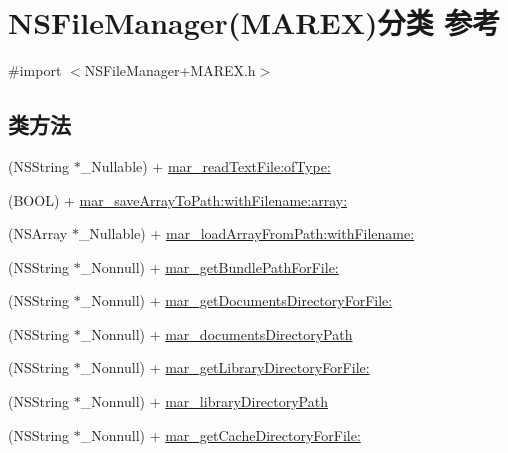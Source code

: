 \hypertarget{category_n_s_file_manager_07_m_a_r_e_x_08}{}\section{N\+S\+File\+Manager(M\+A\+R\+EX)分类 参考}
\label{category_n_s_file_manager_07_m_a_r_e_x_08}


{\ttfamily \#import $<$N\+S\+File\+Manager+\+M\+A\+R\+E\+X.\+h$>$}

\subsection*{类方法}
\begin{DoxyCompactItemize}
\item 
(N\+S\+String $\ast$\+\_\+\+Nullable) + \hyperlink{category_n_s_file_manager_07_m_a_r_e_x_08_a13cf16810e782dfd6c5024bf8e896187}{mar\+\_\+read\+Text\+File\+:of\+Type\+:}
\item 
(B\+O\+OL) + \hyperlink{category_n_s_file_manager_07_m_a_r_e_x_08_a3b9744dbfce7094347afad11a64fef35}{mar\+\_\+save\+Array\+To\+Path\+:with\+Filename\+:array\+:}
\item 
(N\+S\+Array $\ast$\+\_\+\+Nullable) + \hyperlink{category_n_s_file_manager_07_m_a_r_e_x_08_ab821176cefef4a942dfe15f7e144b42c}{mar\+\_\+load\+Array\+From\+Path\+:with\+Filename\+:}
\item 
(N\+S\+String $\ast$\+\_\+\+Nonnull) + \hyperlink{category_n_s_file_manager_07_m_a_r_e_x_08_a231ce96059067c6aaafddeb25eb49436}{mar\+\_\+get\+Bundle\+Path\+For\+File\+:}
\item 
(N\+S\+String $\ast$\+\_\+\+Nonnull) + \hyperlink{category_n_s_file_manager_07_m_a_r_e_x_08_a70753829a80f6a20831c9f90ca37d1a8}{mar\+\_\+get\+Documents\+Directory\+For\+File\+:}
\item 
(N\+S\+String $\ast$\+\_\+\+Nonnull) + \hyperlink{category_n_s_file_manager_07_m_a_r_e_x_08_a2dd533db31c5d66a3bde82627a885981}{mar\+\_\+documents\+Directory\+Path}
\item 
(N\+S\+String $\ast$\+\_\+\+Nonnull) + \hyperlink{category_n_s_file_manager_07_m_a_r_e_x_08_af80857d0bf3c6327dc0fe6ce23bc7a23}{mar\+\_\+get\+Library\+Directory\+For\+File\+:}
\item 
(N\+S\+String $\ast$\+\_\+\+Nonnull) + \hyperlink{category_n_s_file_manager_07_m_a_r_e_x_08_a8843f7d374c97338c9628f62f838c0f9}{mar\+\_\+library\+Directory\+Path}
\item 
(N\+S\+String $\ast$\+\_\+\+Nonnull) + \hyperlink{category_n_s_file_manager_07_m_a_r_e_x_08_a545531e1ab0fc9dfbd4e58c437ce6461}{mar\+\_\+get\+Cache\+Directory\+For\+File\+:}

\end{DoxyCompactItemize}
